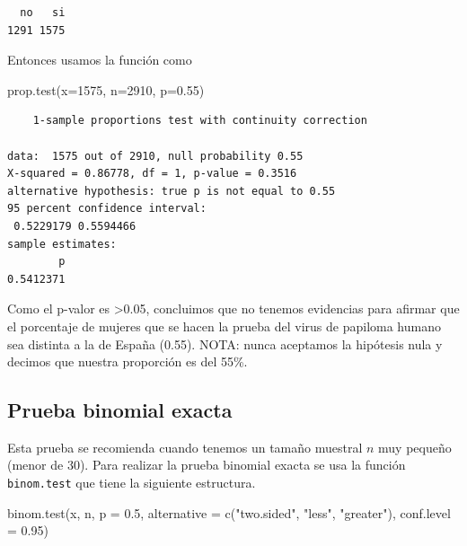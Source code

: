 \documentclass[
]{book}
\newenvironment{Shaded}{\begin{snugshade}}{\end{snugshade}}
\newcommand{\AttributeTok}[1]{\textcolor[rgb]{0.77,0.63,0.00}{#1}}
\newcommand{\DecValTok}[1]{\textcolor[rgb]{0.00,0.00,0.81}{#1}}
\newcommand{\FloatTok}[1]{\textcolor[rgb]{0.00,0.00,0.81}{#1}}
\newcommand{\FunctionTok}[1]{\textcolor[rgb]{0.00,0.00,0.00}{#1}}
\newcommand{\NormalTok}[1]{#1}
\newcommand{\SpecialCharTok}[1]{\textcolor[rgb]{0.00,0.00,0.00}{#1}}
\newcommand{\StringTok}[1]{\textcolor[rgb]{0.31,0.60,0.02}{#1}}
\begin{document}
\begin{Shaded}
\end{Shaded}

\begin{verbatim}
  no   si 
1291 1575 
\end{verbatim}

Entonces usamos la función como

\begin{Shaded}
\begin{Highlighting}[]
\FunctionTok{prop.test}\NormalTok{(}\AttributeTok{x=}\DecValTok{1575}\NormalTok{, }\AttributeTok{n=}\DecValTok{2910}\NormalTok{, }\AttributeTok{p=}\FloatTok{0.55}\NormalTok{)}
\end{Highlighting}
\end{Shaded}

\begin{verbatim}
    1-sample proportions test with continuity correction

data:  1575 out of 2910, null probability 0.55
X-squared = 0.86778, df = 1, p-value = 0.3516
alternative hypothesis: true p is not equal to 0.55
95 percent confidence interval:
 0.5229179 0.5594466
sample estimates:
        p 
0.5412371 
\end{verbatim}

Como el p-valor es \textgreater0.05, concluimos que no tenemos evidencias para afirmar que el porcentaje de mujeres que se hacen la prueba del virus de papiloma humano sea distinta a la de España (0.55). NOTA: nunca aceptamos la hipótesis nula y decimos que nuestra proporción es del 55\%.

\hypertarget{prueba-binomial-exacta}{%
\subsection{Prueba binomial exacta}\label{prueba-binomial-exacta}}

Esta prueba se recomienda cuando tenemos un tamaño muestral \(n\) muy pequeño (menor de 30). Para realizar la prueba binomial exacta se usa la función \texttt{binom.test} que tiene la siguiente estructura.

\begin{Shaded}
\begin{Highlighting}[]
\FunctionTok{binom.test}\NormalTok{(x, n, }\AttributeTok{p =} \FloatTok{0.5}\NormalTok{,}
           \AttributeTok{alternative =} \FunctionTok{c}\NormalTok{(}\StringTok{"two.sided"}\NormalTok{, }\StringTok{"less"}\NormalTok{, }\StringTok{"greater"}\NormalTok{),}
           \AttributeTok{conf.level =} \FloatTok{0.95}\NormalTok{)}
\end{Highlighting}
\end{Shaded}
\end{document}
